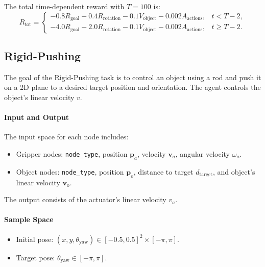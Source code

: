 The total time-dependent reward with $T=100$ is:
\begin{equation*}
    R_\text{tot} = \begin{cases}
        -0.8 R_\text{goal} - 0.4 R_\text{rotation} - 0.1 V_{\text{object}} - 0.002 A_{\text{actions}}, & t < T-2, \\
        -4.0 R_\text{goal} - 2.0 R_\text{rotation} - 0.1 V_{\text{object}} - 0.002 A_{\text{actions}}, & t \geq T-2.
    \end{cases}
\end{equation*}


\subsection{Rigid-Pushing}
The goal of the Rigid-Pushing task is to control an object using a rod and push it on a 2D plane to a desired target position and orientation. The agent controls the object’s linear velocity $v$. 



\paragraph{Input and Output}
The input space for each node includes:
\begin{itemize}
    \item Gripper nodes: \texttt{node\_type}, position $\mathbf{p}_a$, velocity $\mathbf{v}_a$, angular velocity $\omega_a$.
    \item Object nodes: \texttt{node\_type}, position $\mathbf{p}_o$, distance to target $d_{\text{target}}$, and object's linear velocity $\mathbf{v}_{\text{o}}$.
\end{itemize}

The output consists of the actuator's linear velocity $v_a$.

\paragraph{Sample Space}
\begin{itemize}
    \item Initial pose: $(x, y, \theta_\text{yaw}) \in [-0.5, 0.5]^2 \times [-\pi, \pi]$.
    \item Target pose: $\theta_\text{yaw} \in [-\pi, \pi]$.
\end{itemize}

